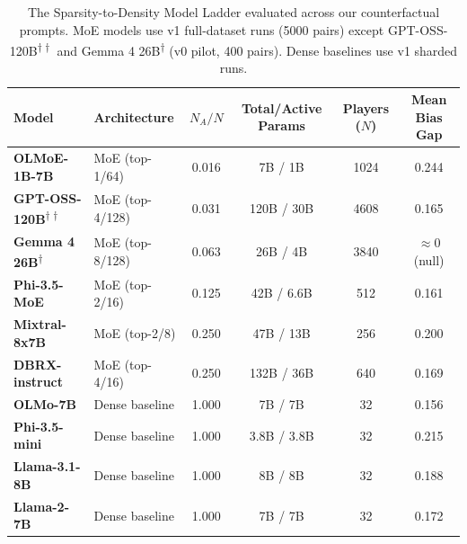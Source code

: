 \documentclass[11pt,a4paper]{article}
\begin{document}
\begin{table}[htbp]
\centering
\caption{The Sparsity-to-Density Model Ladder evaluated across our counterfactual prompts. MoE models use v1 full-dataset runs (5000 pairs) except GPT-OSS-120B\textsuperscript{$\dagger\dagger$} and Gemma 4 26B\textsuperscript{$\dagger$} (v0 pilot, 400 pairs). Dense baselines use v1 sharded runs.}
\label{tab:model_ladder}
\begin{tabular}{llcccc}
\toprule
\textbf{Model} & \textbf{Architecture} & $N_A/N$ & \textbf{Total/Active Params} & \textbf{Players ($N$)} & \textbf{Mean Bias Gap} \\
\midrule
\textbf{OLMoE-1B-7B} & MoE (top-1/64) & 0.016 & 7B / 1B & 1024 & 0.244 \\
\textbf{GPT-OSS-120B}\textsuperscript{$\dagger\dagger$} & MoE (top-4/128) & 0.031 & 120B / 30B & 4608 & 0.165 \\
\textbf{Gemma 4 26B}\textsuperscript{$\dagger$} & MoE (top-8/128) & 0.063 & 26B / 4B & 3840 & $\approx 0$ (null) \\
\textbf{Phi-3.5-MoE} & MoE (top-2/16) & 0.125 & 42B / 6.6B & 512 & 0.161 \\
\textbf{Mixtral-8x7B} & MoE (top-2/8) & 0.250 & 47B / 13B & 256 & 0.200 \\
\textbf{DBRX-instruct} & MoE (top-4/16) & 0.250 & 132B / 36B & 640 & 0.169 \\
\textbf{OLMo-7B} & Dense baseline & 1.000 & 7B / 7B & 32 & 0.156 \\
\textbf{Phi-3.5-mini} & Dense baseline & 1.000 & 3.8B / 3.8B & 32 & 0.215 \\
\textbf{Llama-3.1-8B} & Dense baseline & 1.000 & 8B / 8B & 32 & 0.188 \\
\textbf{Llama-2-7B} & Dense baseline & 1.000 & 7B / 7B & 32 & 0.172 \\
\bottomrule
\end{tabular}
\end{table}

\end{document}
